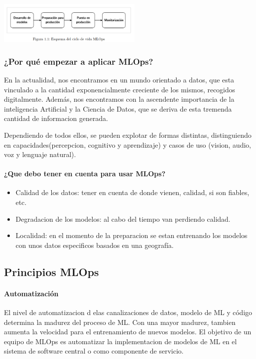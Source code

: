 \documentclass[twoside,twocolumn]{article}
\begin{document}
\includegraphics[width=7cm]{imagenes/imagen1.png}
\subsubsection{¿Por qué empezar a aplicar MLOps?}
En la actualidad, nos encontramos en un mundo orientado a datos, que esta vinculado a la cantidad exponencialmente
creciente de los mismos, recogidos digitalmente. Además, nos encontramos con la ascendente importancia de la inteligencia 
Artificial y la Ciencia de Datos, que se deriva de esta tremenda cantidad de informacion generada.

Dependiendo de todos ellos, se pueden explotar de formas distintas, distinguiendo en capacidades(percepcion, cognitivo y aprendizaje) y casos de uso
(vision, audio, voz y lenguaje natural).

\paragraph{¿Que debo tener en cuenta para usar MLOps?}
\begin{itemize}
    \item  Calidad de los datos: tener en cuenta de donde vienen, calidad, si son fiables, etc.
    \item  Degradacion de los modelos: al cabo del tiempo van perdiendo calidad.
    \item  Localidad: en el momento de la preparacion se estan entrenando los modelos con unos datos especificos basados en una geografía.
\end{itemize}


\subsection{Principios MLOps}
\paragraph{Automatización}
El nivel de automatizacion d elas canalizaciones de datos, modelo de ML y código determina la madurez del 
proceso de ML. Con una mayor madurez, tambien aumenta la velocidad para el entrenamiento de nuevos modelos. El 
objetivo de un equipo de MLOps es automatizar la implementacion de modelos de ML en el sistema de software central o como componente de servicio.
\end{document}
